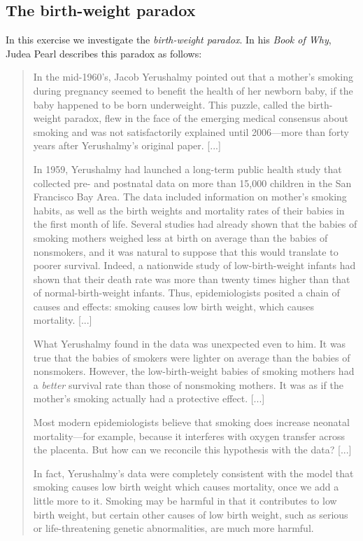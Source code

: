 \subsection{The birth-weight paradox}

In this exercise we investigate the \emph{birth-weight paradox}.
In his \emph{Book of Why}, Judea Pearl describes this paradox as follows:
\begin{quote}
In the mid-1960's, Jacob Yerushalmy pointed out that a mother's smoking during
pregnancy seemed to benefit the health of her newborn baby, if the baby happened to be born underweight.
This puzzle, called the birth-weight paradox, flew in the face of the emerging medical consensus 
about smoking and was not satisfactorily explained until 2006---more than forty years after
Yerushalmy's original paper.
[...]

In 1959, Yerushalmy had launched a long-term public health study that collected pre- and postnatal
data on more than 15,000 children in the San Francisco Bay Area. The data included information on 
mother's smoking habits, as well as the birth weights and mortality rates of their babies in the first month of life.
Several studies had already shown that the babies of smoking mothers weighed less at birth on average than the babies of
nonsmokers, and it was natural to suppose that this would translate to poorer survival. Indeed, a nationwide study of
low-birth-weight infants had shown that their death rate was more than twenty times higher than that of normal-birth-weight infants.
Thus, epidemiologists posited a chain of causes and effects: smoking causes low birth weight, which causes mortality.
[...]

What Yerushalmy found in the data was unexpected even to him. It was true that the babies of smokers were lighter
on average than the babies of nonsmokers. However, the low-birth-weight babies of smoking mothers had a \emph{better}
survival rate than those of nonsmoking mothers. It was as if the mother's smoking actually had a protective effect.
[...]

Most modern epidemiologists believe that smoking does increase neonatal mortality---for example, because it 
interferes with oxygen transfer across the placenta. But how can we reconcile this hypothesis with the data?
[...]

In fact, Yerushalmy's data were completely consistent with the model that smoking causes low birth weight
which causes mortality, once we add a little more to it. Smoking may be harmful in that it contributes to
low birth weight, but certain other causes of low birth weight, such as serious or life-threatening 
genetic abnormalities, are much more harmful.
\end{quote}

